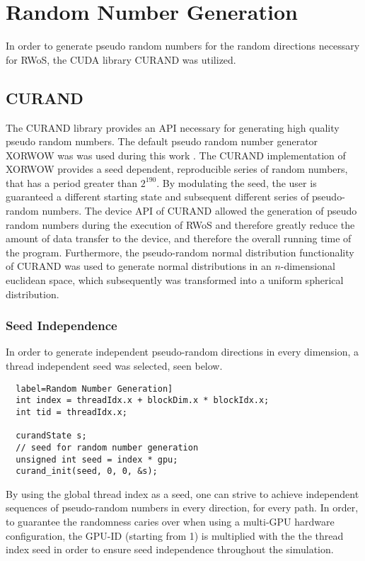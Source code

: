 \section{Random Number Generation}
In order to generate pseudo random numbers for the random directions necessary
for \Gls{RWoS}, the \Gls{CUDA} library \Gls{CURAND} was utilized.
\subsection{CURAND}
The \Gls{CURAND} library provides an API necessary for generating high quality
pseudo random numbers.  The default pseudo random number generator XORWOW was
was used during this work \cite{xorwow}.  The CURAND implementation of XORWOW provides
a seed dependent, reproducible series of random numbers, that has
a period greater than $2^{190}$. By modulating the seed, the user is guaranteed a
different starting state and subsequent different series of pseudo-random numbers.
The device API of \Gls{CURAND} allowed
the generation of pseudo random numbers during the execution of \Gls{RWoS} and
therefore greatly reduce the amount of data transfer to the device, and therefore
the overall running time of the program.  Furthermore, the pseudo-random normal
distribution functionality of \Gls{CURAND} was used to generate normal distributions
in an $n$-dimensional euclidean space, which subsequently was transformed into a uniform spherical
distribution.
\subsubsection{Seed Independence}
In order to generate independent pseudo-random directions in every dimension,
a thread independent seed was selected, seen below.
\begin{verbatim}
  label=Random Number Generation]
  int index = threadIdx.x + blockDim.x * blockIdx.x;
  int tid = threadIdx.x;

  curandState s;
  // seed for random number generation
  unsigned int seed = index * gpu;
  curand_init(seed, 0, 0, &s);
  \end{verbatim}
By using the global thread index as a seed, one can strive to achieve independent
sequences of pseudo-random numbers in every direction, for every path.  In order,
to guarantee the randomness caries over when using a multi-GPU hardware configuration,
the GPU-ID (starting from 1) is multiplied with the the thread index seed in order
to ensure seed independence throughout the simulation.





